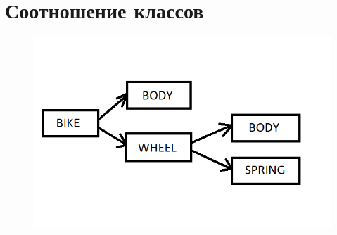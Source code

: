 \documentclass{article}
\begin{document}
\section{Соотношение классов}
\begin{figure}[h]
\includegraphics[]{Безымянный.png}
\centering
\end{figure}\\
\end{document}
